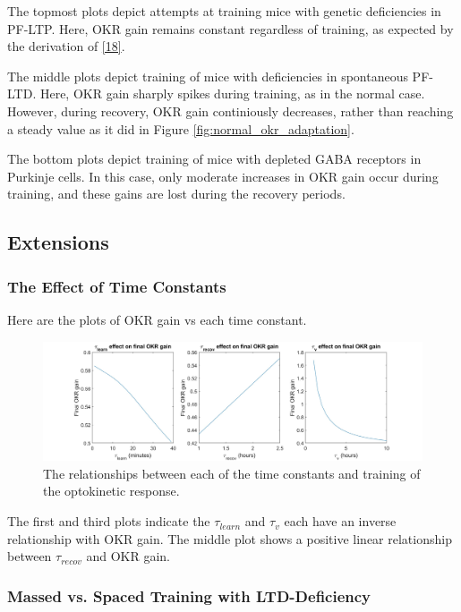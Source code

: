 \documentclass[10pt]{article}
\begin{document}
The topmost plots depict attempts at training mice with genetic deficiencies in PF-LTP. Here, OKR gain remains constant regardless of training, as expected by the derivation of \eqref{18}.

The middle plots depict training of mice with deficiencies in spontaneous PF-LTD. Here, OKR gain sharply spikes during training, as in the normal case. However, during recovery, OKR gain continiously decreases, rather than reaching a steady value as it did in Figure \ref{fig:normal_okr_adaptation}.

The bottom plots depict training of mice with depleted GABA receptors in Purkinje cells. In this case, only moderate increases in OKR gain occur during training, and these gains are lost during the recovery periods.

\subsection{Extensions}

\subsubsection{The Effect of Time Constants}

Here are the plots of OKR gain vs each time constant.

\begin{figure}[h]
    \centering
    \includegraphics[scale=0.15]{images/effect_of_time_constants.jpg}
    \caption{The relationships between each of the time constants and training of the optokinetic response.}
    \label{fig:time_constants}
\end{figure}

The first and third plots indicate the \(\tau_{learn}\) and \(\tau_v\) each have an inverse relationship with OKR gain. The middle plot shows a positive linear relationship between \(\tau_{recov}\) and OKR gain.

\subsubsection{Massed vs. Spaced Training with LTD-Deficiency}
\end{document}
